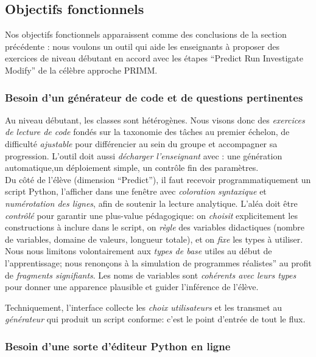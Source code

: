 \documentclass[11pt,a4paper]{article}
\begin{document}
\subsection{Objectifs fonctionnels}
Nos objectifs fonctionnels apparaissent comme des conclusions de la section précédente : nous voulons un outil qui aide les enseignants à proposer des exercices de niveau débutant en accord avec les étapes ``Predict Run Investigate Modify'' de la célèbre approche PRIMM.

\subsubsection{Besoin d'un générateur de code et de questions pertinentes}

Au niveau débutant, les classes sont hétérogènes. Nous visons donc des \emph{exercices de lecture de code} fondés sur la taxonomie des tâches au premier échelon, de difficulté \emph{ajustable} pour différencier au sein du groupe et accompagner sa progression. L’outil doit aussi \emph{décharger l’enseignant} avec : une génération automatique,un déploiement simple, un contrôle fin des paramètres.
\\
Du côté de l’élève (dimension ``Predict''), il faut recevoir programmatiquement un script Python, l’afficher dans une fenêtre avec \emph{coloration syntaxique} et \emph{numérotation des lignes}, afin de soutenir la lecture analytique. L’aléa doit être \emph{contrôlé} pour garantir une plus-value pédagogique: on \emph{choisit} explicitement les constructions à inclure dans le script, on \emph{règle} des variables didactiques (nombre de variables, domaine de valeurs, longueur totale), et on \emph{fixe} les types à utiliser. Nous nous limitons volontairement aux \emph{types de base} utiles au début de l’apprentissage; nous renonçons à la simulation de programmes réalistes'' au profit de \emph{fragments signifiants}. Les noms de variables sont \emph{cohérents avec leurs types} pour donner une apparence plausible et guider l’inférence de l’élève.

Techniquement, l’interface collecte les \emph{choix utilisateurs} et les transmet au \emph{générateur} qui produit un script conforme: c’est le point d’entrée de tout le flux.

\subsubsection{Besoin d'une sorte d'éditeur Python en ligne}
\end{document}
